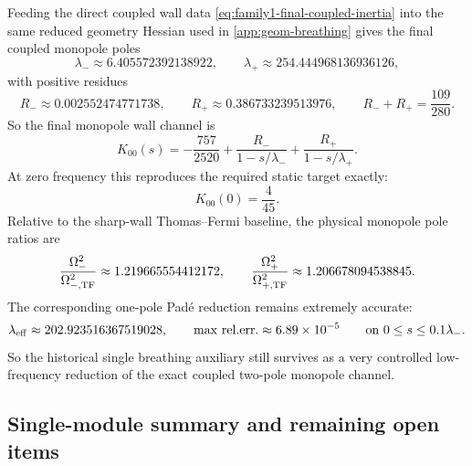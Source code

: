 \documentclass[11pt]{article}
\begin{document}
Feeding the direct coupled wall data
\cref{eq:family1-final-coupled-inertia} into the same reduced geometry Hessian used in
\cref{app:geom-breathing} gives the final coupled monopole poles
\begin{equation}
\lambda_-\approx 6.405572392138922,
\qquad
\lambda_+\approx 254.444968136936126,
\label{eq:family1-final-lambdas}
\end{equation}
with positive residues
\begin{equation}
R_-\approx 0.002552474771738,
\qquad
R_+\approx 0.386733239513976,
\qquad
R_-+R_+=\frac{109}{280}.
\label{eq:family1-final-residues}
\end{equation}
So the final monopole wall channel is
\begin{equation}
K_{00}(s)
=
-\frac{757}{2520}
+\frac{R_-}{1-s/\lambda_-}
+\frac{R_+}{1-s/\lambda_+}.
\label{eq:family1-final-K00s}
\end{equation}
At zero frequency this reproduces the required static target exactly:
\begin{equation}
K_{00}(0)=\frac{4}{45}.
\label{eq:family1-final-K00zero}
\end{equation}
Relative to the sharp-wall Thomas--Fermi baseline, the physical monopole pole ratios are
\begin{equation}
\frac{\Omega_-^2}{\Omega_{-,\rm TF}^2}\approx 1.219665554412172,
\qquad
\frac{\Omega_+^2}{\Omega_{+,\rm TF}^2}\approx 1.206678094538845.
\label{eq:family1-final-pole-ratios}
\end{equation}
The corresponding one-pole Pad\'e reduction remains extremely accurate:
\begin{equation}
\lambda_{\rm eff}\approx 202.923516367519028,
\qquad
\max\,\mathrm{rel.err.}\approx 6.89\times 10^{-5}
\qquad
\text{on }0\le s\le 0.1\lambda_-.
\label{eq:family1-final-pade}
\end{equation}
So the historical single breathing auxiliary still survives as a very controlled
low-frequency reduction of the exact coupled two-pole monopole channel.

\subsection{Single-module summary and remaining open items}
\label{app:family1-final-summary}
\end{document}
